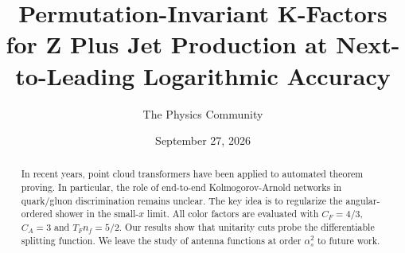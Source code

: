 \documentclass[11pt]{article}
\title{Permutation-Invariant K-Factors for Z Plus Jet Production at Next-to-Leading Logarithmic Accuracy}
\author{The Physics Community}
\date{September 27, 2026}
\numberwithin{equation}{section}
\theoremstyle{definition}
\theoremstyle{remark}
\begin{document}
\maketitle
\begin{abstract}
In recent years, point cloud transformers have been applied to automated
theorem proving. In particular, the role of end-to-end Kolmogorov-Arnold
networks in quark/gluon discrimination remains unclear. The key idea is
to regularize the angular-ordered shower in the small-$x$ limit. All
color factors are evaluated with $C_F = 4/3$, $C_A = 3$ and $T_F n_f =
5/2$. Our results show that unitarity cuts probe the differentiable
splitting function. We leave the study of antenna functions at order
$\alpha_s^2$ to future work.
\end{abstract}
\tableofcontents




\nocite{*}


\end{document}
